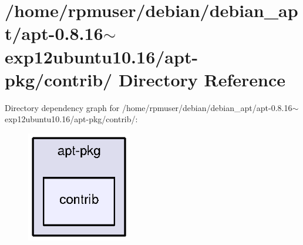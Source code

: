 \section{/home/rpmuser/debian/debian\-\_\-apt/apt-\/0.8.16$\sim$exp12ubuntu10.16/apt-\/pkg/contrib/ \-Directory \-Reference}
\label{dir_bf3f13d1b4e4b88269efc312c4386768}
\-Directory dependency graph for /home/rpmuser/debian/debian\-\_\-apt/apt-\/0.8.16$\sim$exp12ubuntu10.16/apt-\/pkg/contrib/\-:
\nopagebreak
\begin{figure}[H]
\begin{center}
\leavevmode
\includegraphics[width=130pt]{dir_bf3f13d1b4e4b88269efc312c4386768_dep}
\end{center}
\end{figure}
